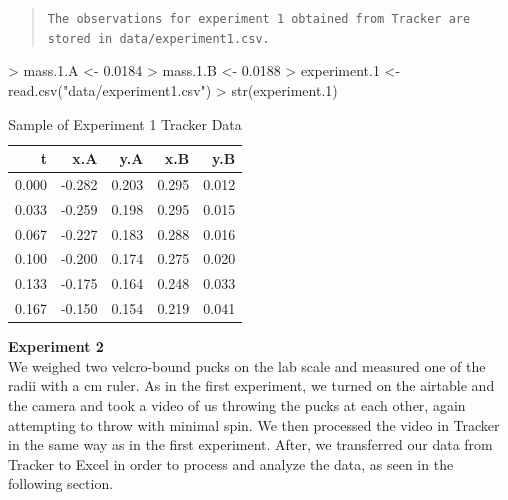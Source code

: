 \documentclass[11pt]{article}
\begin{document}
\begin{quote}
{\tt The observations for experiment 1 obtained from Tracker are stored in data/experiment1.csv.}
\end{quote}

\begin{Schunk}
\begin{Sinput}
> mass.1.A <- 0.0184
> mass.1.B <- 0.0188
> experiment.1 <- read.csv("data/experiment1.csv")
> str(experiment.1)
\end{Sinput}
\end{Schunk}

\begin{table}

\caption{\label{tab:}Sample of Experiment 1 Tracker Data}
\centering
\begin{tabular}[t]{r|r|r|r|r}
\hline
t & x.A & y.A & x.B & y.B\\
\hline
0.000 & -0.282 & 0.203 & 0.295 & 0.012\\
\hline
0.033 & -0.259 & 0.198 & 0.295 & 0.015\\
\hline
0.067 & -0.227 & 0.183 & 0.288 & 0.016\\
\hline
0.100 & -0.200 & 0.174 & 0.275 & 0.020\\
\hline
0.133 & -0.175 & 0.164 & 0.248 & 0.033\\
\hline
0.167 & -0.150 & 0.154 & 0.219 & 0.041\\
\hline
\end{tabular}
\end{table}
{\bf Experiment 2}\\

We weighed two velcro-bound pucks on the lab scale and measured one of the radii with a cm ruler. As in the first experiment, we turned on the airtable and the camera and took a video of us throwing the pucks at each other, again attempting to throw with minimal spin. We then processed the video in Tracker in the same way as in the first experiment. After, we transferred our data from Tracker to Excel in order to process and analyze the data, as seen in the following section.
\end{document}
